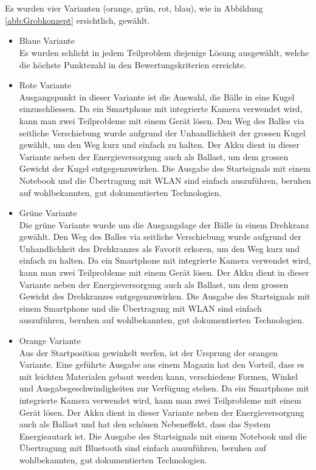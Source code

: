 \\
\\
Es wurden vier Varianten (orange, grün, rot, blau), wie in Abbildung \ref{abb:Grobkonzept} ersichtlich, gewählt. 
\begin{itemize}
	\item Blaue Variante\\
	Es wurden schlicht in jedem Teilproblem diejenige Lösung ausgewählt, welche die höchste Punktezahl in den Bewertungskriterien erreichte.
	
	\item Rote Variante\\
	Ausgangspunkt in dieser Variante ist die Auswahl, die Bälle in eine Kugel einzuschliessen. Da ein Smartphone mit integrierte Kamera verwendet wird, kann man zwei Teilprobleme mit einem Gerät lösen. Den Weg des Balles via seitliche Verschiebung wurde aufgrund der Unhandlichkeit der grossen Kugel gewählt, um den Weg kurz und einfach zu halten. Der Akku dient in dieser Variante neben der Energieversorgung auch als Ballast, um dem grossen Gewicht der Kugel entgegenzuwirken. Die Ausgabe des Startsignals mit einem Notebook und die Übertragung mit WLAN sind einfach auszuführen, beruhen auf wohlbekannten, gut dokumentierten Technologien.
	
	\item Grüne Variante\\
	Die grüne Variante wurde um die Ausgangslage der Bälle in einem Drehkranz gewählt. Den Weg des Balles via seitliche Verschiebung wurde aufgrund der Unhandlichkeit des Drehkranzes als Favorit erkoren, um den Weg kurz und einfach zu halten. Da ein Smartphone mit integrierte Kamera verwendet wird, kann man zwei Teilprobleme mit einem Gerät lösen. Der Akku dient in dieser Variante neben der Energieversorgung auch als Ballast, um dem grossen Gewicht des Drehkranzes entgegenzuwirken. Die Ausgabe des Startsignals mit einem Smartphone und die Übertragung mit WLAN sind einfach auszuführen, beruhen auf wohlbekannten, gut dokumentierten Technologien.
	
	\item Orange Variante\\
	Aus der Startposition gewinkelt werfen, ist der Ursprung der orangen Variante. Eine geführte Ausgabe aus einem Magazin hat den Vorteil, dass es mit leichten Materialen gebaut werden kann, verschiedene Formen, Winkel und Ausgabegeschwindigkeiten zur Verfügung stehen. Da ein Smartphone mit integrierte Kamera verwendet wird, kann man zwei Teilprobleme mit einem Gerät lösen. Der Akku dient in dieser Variante neben der Energieversorgung auch als Ballast und hat den schönen Nebeneffekt, dass das System Energieautark ist. Die Ausgabe des Startsignals mit einem Notebook und die Übertragung mit Bluetooth sind einfach auszuführen, beruhen auf wohlbekannten, gut dokumentierten Technologien.	
\end{itemize}

